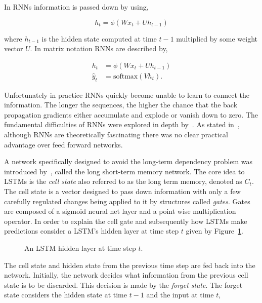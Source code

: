 In RNNs information is passed down by using,

\begin{equation*}
    h_t = \phi(Wx_t + Uh_{t-1})
\end{equation*}

where \(h_{t-1}\) is the hidden state computed at time \(t-1\) multiplied by
some weight vector \(U\). In matrix notation RNNs are described by,

\begin{align}\label{eq:recurrent_neural_network_equations}
    h_t & = \phi(Wx_t + Uh_{t-1}) \\
    \hat{y}_t & = \text{softmax}(Vh_t).
\end{align}

Unfortunately in practice RNNs quickly become unable to learn to connect the
information. The longer the sequences, the higher the chance that
the back propagation gradients either accumulate and explode or vanish down to
zero. The fundamental difficulties of RNNs were explored in depth
by~\cite{Bengio1994}. As stated in~\cite{Hochreiter1997}, although RNNs are
theoretically fascinating there was no clear practical advantage over feed
forward networks.

A network specifically designed to avoid the long-term dependency problem was
introduced by~\cite{Hochreiter1997}, called the long short-term memory
network.
The core idea to LSTMs is the \textit{cell state} also referred to as the
long term memory, denoted as \(C_t\). The cell state is a vector designed to pass down
information with only a few carefully regulated changes being applied to it
by structures called \textit{gates}. Gates are composed of a sigmoid neural
net layer and a point wise multiplication operator. In order to explain
the cell gate and subsequently how LSTMs make predictions consider
a LSTM's hidden layer at time step \(t\) given by Figure~\ref{fig:lstm_cell}.

\begin{figure}[!htbp]
    \centering
    
    \caption{An LSTM hidden layer at time step \(t\).}\label{fig:lstm_cell}
\end{figure}

The cell state and hidden state from the previous time step are fed back
into the network. Initially, the network decides what information from the
previous cell state is to be discarded. This decision is made by the
\textit{forget state}. The forget state considers the hidden state at time
\(t-1\) and the input at time \(t\),

